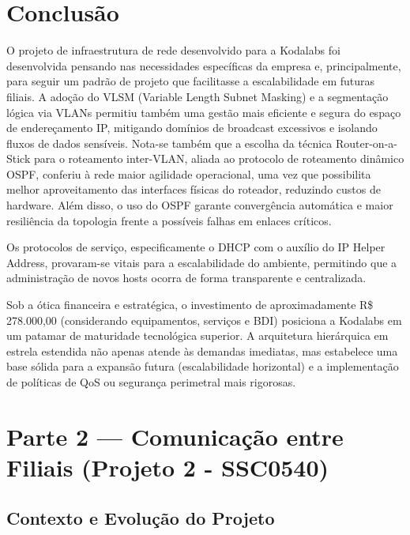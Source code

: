 \documentclass[12pt,a4paper]{article}
\begin{document}
\section{Conclusão}

O projeto de infraestrutura de rede desenvolvido para a Kodalabs foi desenvolvida pensando nas necessidades específicas da empresa e, principalmente, para seguir um padrão de projeto que facilitasse a escalabilidade em futuras filiais. A adoção do VLSM (Variable Length Subnet Masking) e a segmentação lógica via VLANs  permitiu também uma gestão mais eficiente e segura do espaço de endereçamento IP, mitigando domínios de broadcast excessivos e isolando fluxos de dados sensíveis.
Nota-se também que a escolha da técnica Router-on-a-Stick para o roteamento inter-VLAN, aliada ao protocolo de roteamento dinâmico OSPF, conferiu à rede maior agilidade operacional, uma vez que possibilita melhor aproveitamento das interfaces físicas do roteador, reduzindo custos de hardware. Além disso, o uso do OSPF garante convergência automática e maior resiliência da topologia frente a possíveis falhas em enlaces críticos.

Os protocolos de serviço, especificamente o DHCP com o auxílio do IP Helper Address, provaram-se vitais para a escalabilidade do ambiente, permitindo que a administração de novos hosts ocorra de forma transparente e centralizada. 

Sob a ótica financeira e estratégica, o investimento de aproximadamente R\$ 278.000,00 (considerando equipamentos, serviços e BDI) posiciona a Kodalabs em um patamar de maturidade tecnológica superior. A arquitetura hierárquica em estrela estendida não apenas atende às demandas imediatas, mas estabelece uma base sólida para a expansão futura (escalabilidade horizontal) e a implementação de políticas de QoS ou segurança perimetral mais rigorosas. 



\section{Parte 2 — Comunicação entre Filiais (Projeto 2 - SSC0540)}

\subsection{Contexto e Evolução do Projeto}
\end{document}

